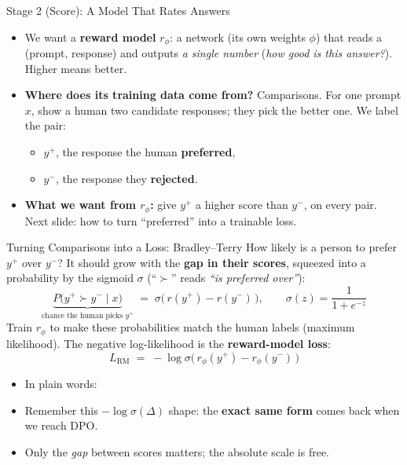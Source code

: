 \begin{frame}{Stage 2 (Score): A Model That Rates Answers}
\begin{itemize}\itemsep0.5em
    \item We want a \textbf{reward model} $r_\phi$: a network (its own weights
          $\phi$) that reads a (prompt, response) and outputs \emph{a single
          number} (\emph{how good is this answer?}). Higher means better.
    \item \textbf{Where does its training data come from?} Comparisons. For one
          prompt $x$, show a human two candidate responses; they pick the better
          one. We label the pair:
    \begin{itemize}\footnotesize\itemsep0.15em
        \item $y^+$, the response the human \textbf{preferred},
        \item $y^-$, the response they \textbf{rejected}.
    \end{itemize}
    \item \textbf{What we want from $r_\phi$:} give $y^+$ a higher score than $y^-$,
          on every pair. Next slide: how to turn ``preferred'' into a trainable
          loss.
\end{itemize}
\end{frame}

\begin{frame}{Turning Comparisons into a Loss: Bradley--Terry}
How likely is a person to prefer $y^+$ over $y^-$? It should grow with the
\textbf{gap in their scores}, squeezed into a probability by the sigmoid $\sigma$
(``$\succ$'' reads \emph{``is preferred over''}):
\[
    \underbrace{P\big(y^+ \succ y^- \mid x\big)}_{\text{chance the human picks } y^+}
    \;=\; \sigma\big(\, r(y^+) - r(y^-) \, \big),
    \qquad \sigma(z) = \frac{1}{1 + e^{-z}}
\]
Train $r_\phi$ to make these probabilities match the human labels (maximum
likelihood). The negative log-likelihood is the \textbf{reward-model loss}:
\[
    L_{\mathrm{RM}} \;=\; -\log\sigma\big(\, r_\phi(y^+) - r_\phi(y^-) \, \big)
\]
\begin{itemize}\itemsep0.2em\small
    \item In plain words: 
    \item Remember this $-\log\sigma(\Delta)$ shape: the \textbf{exact same form}
          comes back when we reach DPO.
    \item Only the \emph{gap} between scores matters; the absolute scale is free.
\end{itemize}
\end{frame}


